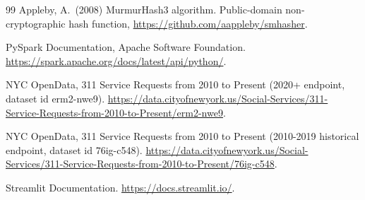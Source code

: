 \documentclass[11pt,letterpaper]{book}
\begin{document}
\begin{thebibliography}{99}
 Appleby, A.\ (2008) MurmurHash3 algorithm. Public-domain non-cryptographic hash function, \url{https://github.com/aappleby/smhasher}.

 PySpark Documentation, Apache Software Foundation. \url{https://spark.apache.org/docs/latest/api/python/}.

 NYC OpenData, 311 Service Requests from 2010 to Present (2020+ endpoint, dataset id erm2-nwe9). \url{https://data.cityofnewyork.us/Social-Services/311-Service-Requests-from-2010-to-Present/erm2-nwe9}.

 NYC OpenData, 311 Service Requests from 2010 to Present (2010-2019 historical endpoint, dataset id 76ig-c548). \url{https://data.cityofnewyork.us/Social-Services/311-Service-Requests-from-2010-to-Present/76ig-c548}.

 Streamlit Documentation. \url{https://docs.streamlit.io/}.

\end{thebibliography}

\printindex
\end{document}

